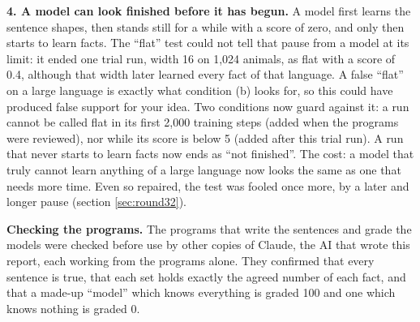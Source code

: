 \textbf{4. A model can look finished before it has begun.} A model first learns the sentence
shapes, then stands still for a while with a score of zero, and only then starts to learn
facts. The ``flat'' test could not tell that pause from a model at its limit: it ended one trial
run, width 16 on 1,024 animals, as flat with a score of 0.4, although that width later learned
every fact of that language. A false ``flat'' on a large language is exactly what condition (b)
looks for, so this could have produced false support for your idea. Two conditions now
guard against it: a run cannot be called flat in its first 2,000 training steps (added when the
programs were reviewed), nor while its score is below 5 (added after this trial run).
A run that never starts to learn facts now ends as ``not finished''. The cost: a model that
truly cannot learn anything of a large language now looks the same as one that needs more time. Even so
repaired, the test was fooled once more, by a later and longer pause (section
\ref{sec:round32}).

\textbf{Checking the programs.} The programs that write the sentences and grade the models
were checked before use by other copies of Claude, the AI that wrote this report, each working
from the programs alone. They confirmed that every sentence is true, that each set holds
exactly the agreed number of each fact, and that a made-up ``model'' which knows everything is
graded 100 and one which knows nothing is graded 0.
